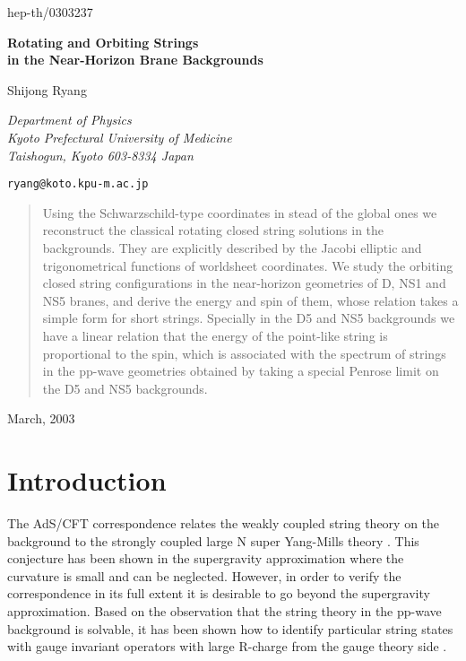 \documentclass[12pt,a4paper]{article}
\begin{document}
\begin{flushright}
hep-th/0303237
\end{flushright}
\vspace{1.8cm}

\begin{center}
 \textbf{\Large Rotating and Orbiting Strings \\ 
in the Near-Horizon Brane Backgrounds}
\end{center}
\vspace{1.6cm}
\begin{center}
 Shijong Ryang
\end{center}

\begin{center}
\textit{Department of Physics \\ Kyoto Prefectural University of Medicine
\\ Taishogun, Kyoto 603-8334 Japan}  \par
\texttt{ryang@koto.kpu-m.ac.jp}
\end{center}
\vspace{2.8cm}
\begin{abstract}
Using the Schwarzschild-type coordinates in stead of the global ones we
reconstruct the classical rotating closed string solutions in the 
\coordHE{} backgrounds. They are explicitly described by the 
Jacobi elliptic and trigonometrical functions of worldsheet coordinates.
We study the orbiting closed string configurations in the near-horizon 
geometries of D\coordHE{}, NS1 and NS5 branes, and derive the energy and spin
of them, whose relation takes a simple form for short strings.
Specially in the D5 and NS5 backgrounds we have a linear relation that
the energy of the point-like string is proportional to the spin,
which is associated with the spectrum of strings in the pp-wave geometries
obtained by taking a special Penrose limit on the D5 and NS5 backgrounds.
\end{abstract} 
\vspace{3cm}
\begin{flushleft}
March, 2003
\end{flushleft}


\newpage
\section{Introduction}

The AdS/CFT correspondence relates the weakly coupled string theory 
on the \coordHE{} background to the strongly coupled large N
\coordHE{} super Yang-Mills theory \cite{JM,GKP,EW}.
This conjecture has been shown in the supergravity approximation
where the curvature is small and \coordHE{} can be neglected. 
However, in order to verify the correspondence in its full extent it is
desirable to go beyond the supergravity approximation. Based on the 
observation \cite{RM,MT} that the string theory in the pp-wave 
background \cite{BF} is solvable, it has been shown how to identify 
particular string states with gauge invariant operators with large 
R-charge from the gauge theory side \cite{BMN}.
\end{document}
